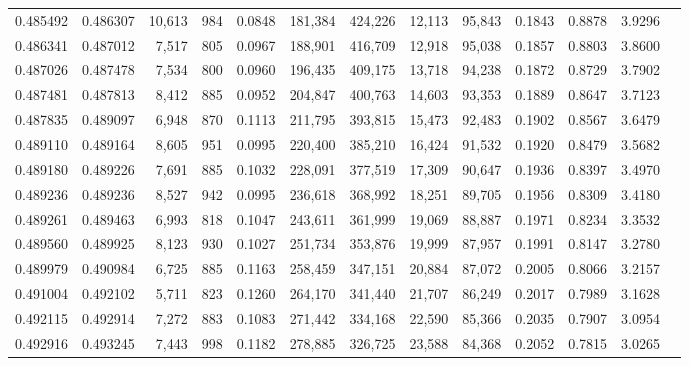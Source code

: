 \begin{tabular}{rrrrrrrrrrrrr}
0.485492 & 0.486307 & 10,613 &   984 &                                     0.0848 & 181,384 & 424,226 &  12,113 &  95,843 & 0.1843 & 0.8878 & 3.9296 \\
0.486341 & 0.487012 &  7,517 &   805 &                                     0.0967 & 188,901 & 416,709 &  12,918 &  95,038 & 0.1857 & 0.8803 & 3.8600 \\
0.487026 & 0.487478 &  7,534 &   800 &                                     0.0960 & 196,435 & 409,175 &  13,718 &  94,238 & 0.1872 & 0.8729 & 3.7902 \\
0.487481 & 0.487813 &  8,412 &   885 &                                     0.0952 & 204,847 & 400,763 &  14,603 &  93,353 & 0.1889 & 0.8647 & 3.7123 \\
0.487835 & 0.489097 &  6,948 &   870 &                                     0.1113 & 211,795 & 393,815 &  15,473 &  92,483 & 0.1902 & 0.8567 & 3.6479 \\
0.489110 & 0.489164 &  8,605 &   951 &                                     0.0995 & 220,400 & 385,210 &  16,424 &  91,532 & 0.1920 & 0.8479 & 3.5682 \\
0.489180 & 0.489226 &  7,691 &   885 &                                     0.1032 & 228,091 & 377,519 &  17,309 &  90,647 & 0.1936 & 0.8397 & 3.4970 \\
0.489236 & 0.489236 &  8,527 &   942 &                                     0.0995 & 236,618 & 368,992 &  18,251 &  89,705 & 0.1956 & 0.8309 & 3.4180 \\
0.489261 & 0.489463 &  6,993 &   818 &                                     0.1047 & 243,611 & 361,999 &  19,069 &  88,887 & 0.1971 & 0.8234 & 3.3532 \\
0.489560 & 0.489925 &  8,123 &   930 &                                     0.1027 & 251,734 & 353,876 &  19,999 &  87,957 & 0.1991 & 0.8147 & 3.2780 \\
0.489979 & 0.490984 &  6,725 &   885 &                                     0.1163 & 258,459 & 347,151 &  20,884 &  87,072 & 0.2005 & 0.8066 & 3.2157 \\
0.491004 & 0.492102 &  5,711 &   823 &                                     0.1260 & 264,170 & 341,440 &  21,707 &  86,249 & 0.2017 & 0.7989 & 3.1628 \\
0.492115 & 0.492914 &  7,272 &   883 &                                     0.1083 & 271,442 & 334,168 &  22,590 &  85,366 & 0.2035 & 0.7907 & 3.0954 \\
0.492916 & 0.493245 &  7,443 &   998 &                                     0.1182 & 278,885 & 326,725 &  23,588 &  84,368 & 0.2052 & 0.7815 & 3.0265 \\

\end{tabular}
